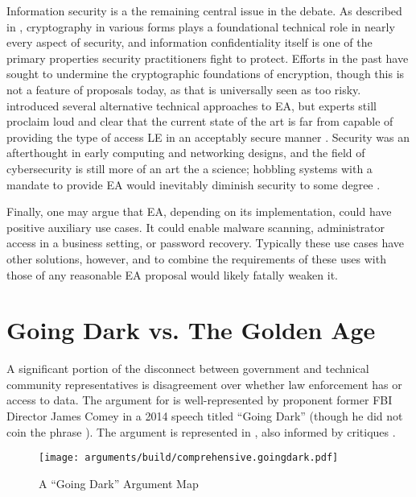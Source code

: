 Information security is a the remaining central issue in the debate. As described in ,
\ac{cryptography} in various forms plays a foundational technical role in nearly every aspect of security, and
information confidentiality itself is one of the primary properties security practitioners fight to protect. Efforts in
the past have sought to undermine the cryptographic foundations of encryption, though this is not a feature of proposals
today, as that is universally seen as too risky.  introduced several alternative technical
approaches to \ac{EA}, but experts still proclaim loud and clear that the current state of the art is far from capable
of providing the type of access \acl{LE} in an acceptably secure manner \cite{abelson_2015} \cite{abelson_risks_1997}.
Security was an afterthought in early computing and networking designs, and the field of cybersecurity is still more of
an art the a science; hobbling systems with a mandate to provide \ac{EA} would inevitably diminish security to some
degree \cite{abelson_2015}.

Finally, one may argue that \ac{EA}, depending on its implementation, could have positive auxiliary use cases. It could
enable malware scanning, administrator access in a business setting, or password recovery. Typically these use cases
have other solutions, however, and to combine the requirements of these uses with those of any reasonable \ac{EA}
proposal would likely fatally weaken it.


\section{Going Dark vs. The Golden Age}

A significant portion of the disconnect between government and technical community representatives is disagreement over
whether law enforcement has  or  access to data. The argument for  is
well-represented by proponent former \ac{FBI} Director James Comey in a 2014 speech titled ``Going Dark''
\cite{comey_2014} (though he did not coin the phrase \cite{swire_encryption_2011}). The argument is represented in
, also informed by critiques \cite{rogaway_moral_2015}.

\begin{figure}[t!]
  \centering\CaptionFontSize
  \texttt{[image: arguments/build/comprehensive.goingdark.pdf]}
  \caption{A ``Going Dark'' Argument Map}
  \label{fig-arg-going-dark}
\end{figure}

